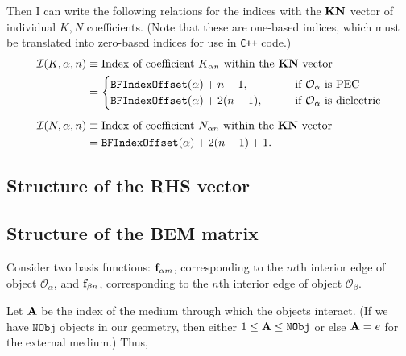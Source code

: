 \documentclass[letterpaper]{article}
\begin{document}
Then I can write the following relations for the indices 
with the $\mathbf{KN}$ vector of individual $K, N$ coefficients.
(Note that these are one-based indices, which must be translated
into zero-based indices for use in \texttt{C++} code.)
\begin{align*}
\mathcal{I}(K, \alpha, n)
&\equiv \text{Index of coefficient $K_{\alpha n}$
              within the $\mathbf{KN}$ vector}
\\
&=\begin{cases}
   \texttt{BFIndexOffset}(\alpha) + n-1, 
   \qquad &\text{if $\mathcal{O}_\alpha$ is PEC} \\
   \texttt{BFIndexOffset}(\alpha) + 2(n-1),
   \qquad &\text{if $\mathcal{O}_\alpha$ is dielectric}
  \end{cases}
\\[5pt]
\mathcal{I}(N, \alpha, n)
&\equiv \text{Index of coefficient $N_{\alpha n}$ 
              within the $\mathbf{KN}$ vector}
\\
&=\texttt{BFIndexOffset}(\alpha) + 2(n-1)+1.
\end{align*}

\subsection{Structure of the RHS vector}

\subsection{Structure of the BEM matrix}

Consider two basis functions: $\mathbf{f}_{\alpha m}$, corresponding
to the $m$th interior edge of object $\mathcal{O}_\alpha$,
and $\mathbf{f}_{\beta n}$, corresponding to the $n$th interior edge
of object $\mathcal{O}_\beta.$ 

Let $\mathbf{A}$ be the index of the medium through which the 
objects interact. (If we have $\texttt{NObj}$ objects in 
our geometry, then either $1\le \mathbf{A} \le \texttt{NObj}$ 
or else $\mathbf{A}=e$ for the external medium.) Thus,
\end{document}
